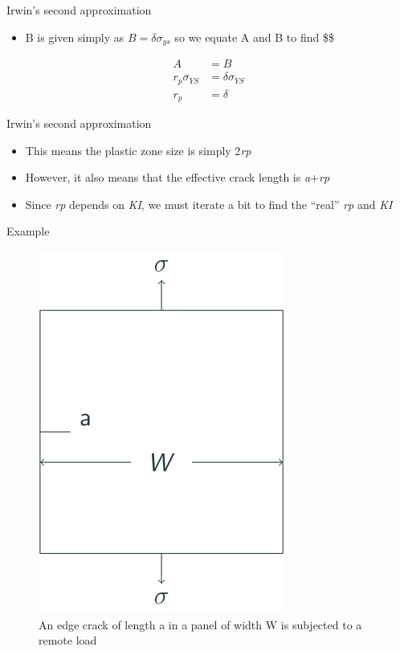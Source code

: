 \documentclass[
  letterpaper,
  ignorenonframetext,
  aspectratio=43,
  handout,
  12pt]{beamer}
\providecommand{\tightlist}{%
  \setlength{\itemsep}{0pt}\setlength{\parskip}{0pt}}
\providecommand{\tightlist}{%
\setlength{\itemsep}{0pt}\setlength{\parskip}{0pt}}
\let\Oldincludegraphics\includegraphics
\renewcommand{\includegraphics}[2][]{\Oldincludegraphics[width=\textwidth,height=0.7\textheight,keepaspectratio]{#2}}
\begin{document}
\begin{frame}{Irwin's second approximation}
\protect\hypertarget{irwins-second-approximation-7}{}
\begin{itemize}
\tightlist
\item
  B is given simply as \(B=\delta \sigma_{ys}\) so we equate A and B to
  find \$\delta\$
\end{itemize}

\[\begin{aligned}
  A &= B\\
  r_p \sigma_{YS} &= \delta \sigma_{YS}\\
  r_p &= \delta
\end{aligned}\]
\end{frame}

\begin{frame}{Irwin's second approximation}
\protect\hypertarget{irwins-second-approximation-8}{}
\begin{itemize}
\tightlist
\item
  This means the plastic zone size is simply 2\emph{r}\emph{p}
\item
  However, it also means that the effective crack length is
  \emph{a}+\emph{r}\emph{p}
\item
  Since \emph{r}\emph{p} depends on \emph{K}\emph{I}, we must iterate a
  bit to find the ``real'' \emph{r}\emph{p} and \emph{K}\emph{I}
\end{itemize}
\end{frame}

\begin{frame}{Example}
\protect\hypertarget{example-1}{}
\begin{figure}
\centering
\includegraphics{../images/plastic-example.svg}
\caption{An edge crack of length a in a panel of width W is subjected to
a remote load}
\end{figure}
\end{frame}
\end{document}
